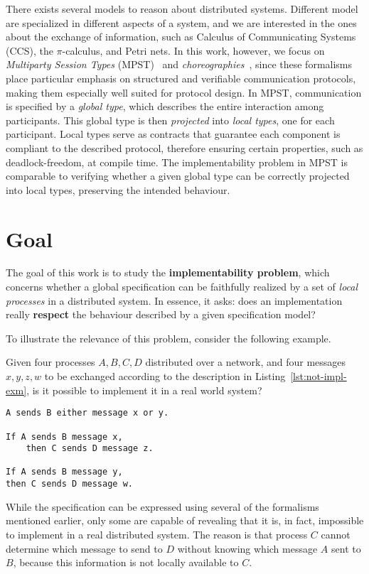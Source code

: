 There exists several models to reason about distributed systems.
Different model are specialized in different aspects of a system, and we
are interested in the ones about the exchange of information, such as
Calculus of Communicating Systems (CCS), the $\pi$-calculus, and Petri nets.
In this work, however, we focus on 
\textit{Multiparty Session Types} (MPST)~\cite{honda2008multiparty} 
and \textit{choreographies}~\cite{montesi2014choreographic}, 
since these formalisms place particular emphasis on structured and 
verifiable communication protocols, making them especially well suited 
for protocol design.
In MPST, communication is specified by a \emph{global type}, which 
describes the entire interaction among participants. 
This global type is then \emph{projected} into 
\emph{local types}, one for each participant. 
Local types serve as contracts that guarantee each component is compliant to 
the described protocol, therefore ensuring certain properties, 
such as deadlock-freedom, at compile time. 
The implementability problem in MPST is comparable to verifying 
whether a given global type can be correctly projected into local 
types, preserving the intended behaviour.

\section{Goal}
The goal of this work is to study the \textbf{implementability
problem}, which concerns whether a global specification can be
faithfully realized by a set of \textit{local processes} in a
distributed system.
In essence, it asks: does an implementation really \textbf{respect}
the behaviour described by a given specification model?

To illustrate the relevance of this problem, consider the following
example.
\begin{example}
Given four processes $A, B, C, D$ distributed over
a network, and four messages $x, y, z, w$ to be exchanged according to
the description in Listing~\ref{lst:not-impl-exm}, is it possible to
implement it in a real world system?

\begin{lstlisting}[caption={Example specification of message exchanges},
                   label={lst:not-impl-exm},
                   keywordstyle=\color{blue}\bfseries,morekeywords={sends,If,then}]
A sends B either message x or y.

If A sends B message x,
    then C sends D message z.

If A sends B message y,
then C sends D message w.
\end{lstlisting}
While the specification can be expressed using several of the
formalisms mentioned earlier, only some are capable of revealing that
it is, in fact, impossible to implement in a real distributed system.
The reason is that process $C$ cannot determine which message to send
to $D$ without knowing which message $A$ sent to $B$, because this 
information is not locally available to $C$.
\end{example}

